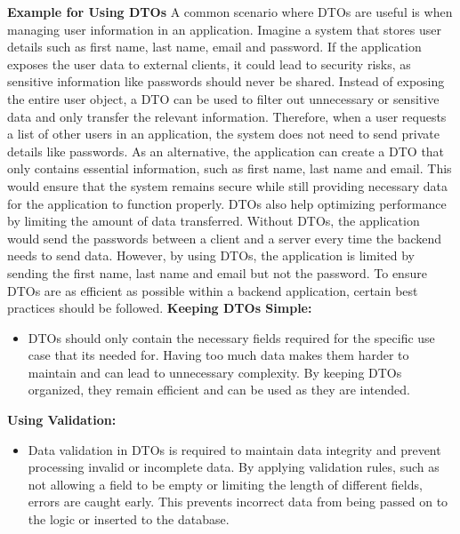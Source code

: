     \textbf{Example for Using DTOs} \newline
    A common scenario where DTOs are useful is when managing user information in an application. \newline
    Imagine a system that stores user details such as first name, last name, email and password. If the application exposes the user data to external clients, it could lead to security risks, as sensitive information like passwords should never be shared. Instead of exposing the entire user object, a DTO can be used to filter out unnecessary or sensitive data and only transfer the relevant information. \newline
    Therefore, when a user requests a list of other users in an application, the system does not need to send private details like passwords. As an alternative, the application can create a DTO that only contains essential information, such as first name, last name and email. This would ensure that the system remains secure while still providing necessary data for the application to function properly. \newline
    DTOs also help optimizing performance by limiting the amount of data transferred. Without DTOs, the application would send the passwords between a client and a server every time the backend needs to send data. However, by using DTOs, the application is limited by sending the first name, last name and email but not the password. \newline 
    To ensure DTOs are as efficient as possible within a backend application, certain best practices should be followed. \newline 
    \textbf{Keeping DTOs Simple:}
        \begin{itemize}
            \item DTOs should only contain the necessary fields required for the specific use case that its needed for. Having too much data makes them harder to maintain and can lead to unnecessary complexity. By keeping DTOs organized, they remain efficient and can be used as they are intended.
        \end{itemize}
    \textbf{Using Validation:}
        \begin{itemize}
            \item Data validation in DTOs is required to maintain data integrity and prevent processing invalid or incomplete data. By applying validation rules, such as not allowing a field to be empty or limiting the length of different fields, errors are caught early. This prevents incorrect data from being passed on to the logic or inserted to the database. \newpage
        \end{itemize}
